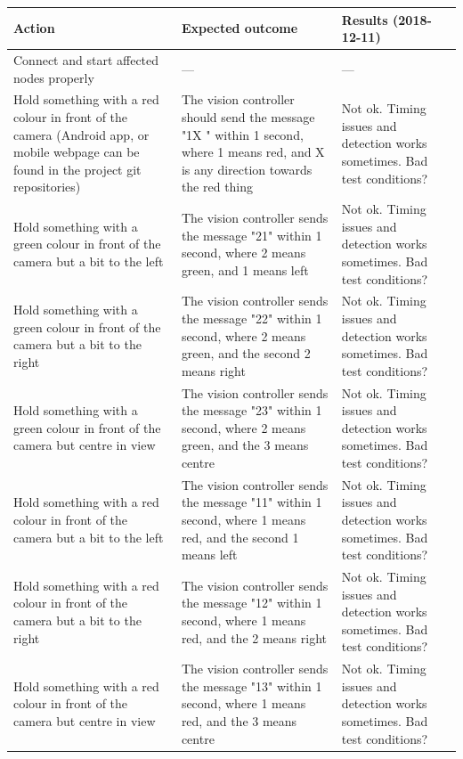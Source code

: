 \documentclass[11pt, titlepage]{article} %
\begin{document}
\begin{table}[h]
 \label{tab:title}
\centering
\begin{tabular}{|m{5cm}|m{5cm}|m{5cm}|}
\hline
Action & Expected outcome & Results (2018-12-11) \\ \hline
Connect and start affected nodes properly  &  ---     & ---  \\ \hline
Hold something with a red colour in front of the camera (Android app, or mobile webpage can be found in the project git repositories)  & The vision controller should send the message "1X " within 1 second, where 1 means red, and X is any direction towards the red thing      & Not ok. Timing issues and detection works sometimes. Bad test conditions?  \\ \hline
Hold something with a green colour in front of the camera but a bit to the left  & The vision controller sends the message "21" within 1 second, where 2 means green, and 1 means left      & Not ok. Timing issues and detection works sometimes. Bad test conditions?  \\ \hline
Hold something with a green colour in front of the camera but a bit to the right  & The vision controller sends the message "22" within 1 second, where 2 means green, and the second 2 means right     & Not ok. Timing issues and detection works sometimes. Bad test conditions?  \\ \hline
Hold something with a green colour in front of the camera but centre in view  & The vision controller sends the message "23" within 1 second, where 2 means green, and the 3 means centre      & Not ok. Timing issues and detection works sometimes. Bad test conditions?  \\ \hline
Hold something with a red colour in front of the camera but a bit to the left  & The vision controller sends the message "11" within 1 second, where 1 means red, and the second 1 means left      & Not ok. Timing issues and detection works sometimes. Bad test conditions?  \\ \hline
Hold something with a red colour in front of the camera but a bit to the right  & The vision controller sends the message "12" within 1 second, where 1 means red, and the 2 means right      & Not ok. Timing issues and detection works sometimes. Bad test conditions?  \\ \hline
Hold something with a red colour in front of the camera but centre in view  &  The vision controller sends the message "13" within 1 second, where 1 means red, and the 3 means centre     & Not ok. Timing issues and detection works sometimes. Bad test conditions?  \\ \hline

\end{tabular}
\end{table}
\end{document}
